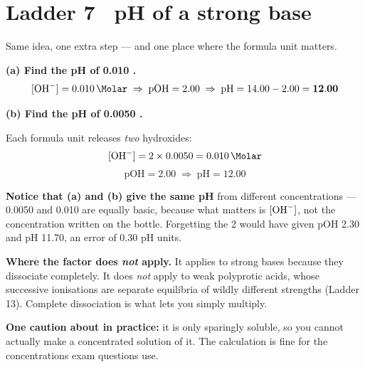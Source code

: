 \documentclass{apchem-worksheet}
\begin{document}
\section*{\sffamily Ladder 7 \textbullet\ pH of a strong base}

Same idea, one extra step --- and one place where the formula unit
matters.

\begin{center}
\end{center}

\begin{workedexample}
\textbf{(a) Find the pH of \SI{0.010}{\Molar} .}
\[ [\ce{OH-}] = \SI{0.010}{\Molar}
   \;\Rightarrow\;
   \text{pOH} = 2.00
   \;\Rightarrow\;
   \text{pH} = 14.00 - 2.00 = \mathbf{12.00} \]

\textbf{(b) Find the pH of \SI{0.0050}{\Molar} .}

Each formula unit releases \emph{two} hydroxides:
\[ [\ce{OH-}] = 2 \times 0.0050 = \SI{0.010}{\Molar} \]
\[ \text{pOH} = 2.00
   \;\Rightarrow\;
   \text{pH} = \mathbf{12.00} \]

\textbf{Notice that (a) and (b) give the same pH} from different
concentrations --- \SI{0.0050}{\Molar}  and
\SI{0.010}{\Molar}  are equally basic, because what matters is
$[\ce{OH-}]$, not the concentration written on the bottle. Forgetting
the 2 would have given pOH 2.30 and pH 11.70, an error of 0.30 pH
units.

\textbf{Where the factor does \emph{not} apply.} It applies to strong
bases because they dissociate completely. It does \emph{not} apply to
weak polyprotic acids, whose successive ionisations are separate
equilibria of wildly different strengths (Ladder 13). Complete
dissociation is what lets you simply multiply.

\textbf{One caution about  in practice:} it is only
sparingly soluble, so you cannot actually make a concentrated solution
of it. The calculation is fine for the concentrations exam questions
use.
\end{workedexample}
\end{document}

